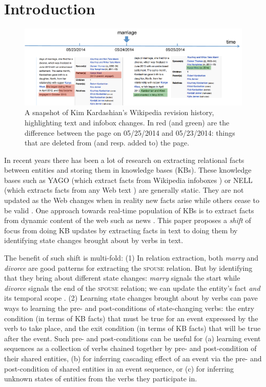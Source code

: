 \section{Introduction}

\begin{figure}[t]
\begin{center}
\includegraphics[width=15cm,keepaspectratio=true]{figures/motivation.pdf}
\caption{\label{fig:motivation} A snapshot of Kim Kardashian's Wikipedia revision history, highlighting text and infobox changes. In red (and green) are the difference between the page on 05/25/2014 and 05/23/2014: things that are deleted from (and resp. added to) the page.}
\end{center}
\end{figure}

In recent years there has been a lot of research on extracting relational facts between entities and storing them in knowledge bases (KBs). These knowledge bases such as YAGO (which extract facts from Wikipedia infoboxes \cite{suchanek2007yago}) or NELL (which extracts facts from any Web text \cite{carlson2010toward,fader2011identifying}) are generally static. They are not updated as the Web changes when in reality new facts arise while others cease to be valid%
. One approach towards real-time population of KBs is to extract facts from dynamic content of the web such as news \cite{nakashole2012real}. This paper proposes a \textit{shift} of focus from doing KB updates by extracting facts in text to doing them by identifying state changes brought about by verbs in text. 

The benefit of such shift is multi-fold: (1) In relation extraction, both \textit{marry} and \textit{divorce} are good patterns for extracting the \textsc{spouse} relation. But by identifying that they bring about different state changes: \textit{marry} signals the start while \textit{divorce} signals the end of the \textsc{spouse} relation; we can update the entity's fact \textit{and} its temporal scope \cite{wijayactp}. (2) Learning state changes brought about by verbs can pave ways to learning the pre- and post-conditions of state-changing verbs: the entry condition (in terms of KB facts) that must be true for an event expressed by the verb to take place, and the exit condition (in terms of KB facts) that will be true after the event. Such pre- and post-conditions can be useful for (a) learning event sequences %
as a collection of verbs chained together by pre- and post-condition of their shared entities, (b) for inferring cascading effect of an event via the pre- and post-condition of shared entities in an event sequence, or (c) for inferring unknown states of entities from the verbs they participate in.  

